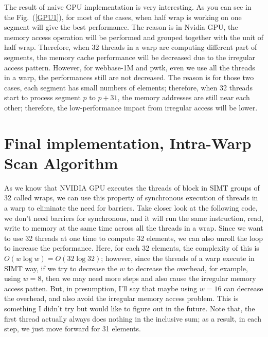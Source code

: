 \documentclass[preprint, prX, amsmath,amssymb]{revtex4-1}
\begin{document}
The result of naive GPU implementation is very interesting. As you can see in the Fig.~(\ref{GPU1}), for most of the cases, when half wrap is working on one segment will give the best performance. The reason is in Nvidia GPU, the memory access operation will be performed and grouped together with the unit of half wrap. Therefore, when 32 threads in a warp are computing different part of segments, the memory cache performance will be decreased due to the irregular access pattern. However, for webbase-1M and pwtk, even we use all the threads in a warp, the performances still are not decreased. The reason is for those two cases, each segment has small numbers of elements; therefore, when 32 threads start to process segment $p$ to $p+31$, the memory addresses are still near each other; therefore, the low-performance impact from irregular access will be lower.

\section{Final implementation, Intra-Warp Scan Algorithm}

As we know that NVIDIA GPU executes the threads of block in SIMT groups of 32 called wraps, we can use this property of synchronous execution of threads in a warp to eliminate the need for barriers. Take closer look at the following code, we don't need barriers for synchronous, and it will run the same instruction, read, write to memory at the same time across all the threads in a wrap.  Since we want to use 32 threads at one time to compute 32 elements, we can also unroll the loop to increase the performance. Here, for each 32 elements, the complexity of this is $O(w\log w) = O(32\log32)$; however, since the threads of a warp execute in SIMT way, if we try to decrease the $w$ to decrease the overhead, for example, using $w=8$, then we may need more steps and also cause the irregular memory access patten. But, in presumption, I'll say that maybe using $w=16$ can decrease the overhead, and also avoid the irregular memory access problem. This is something I didn't try but would like to figure out in the future. Note that, the first thread actually always does nothing in the inclusive sum; as a result, in each step, we just move forward for 31 elements. 
\end{document}
